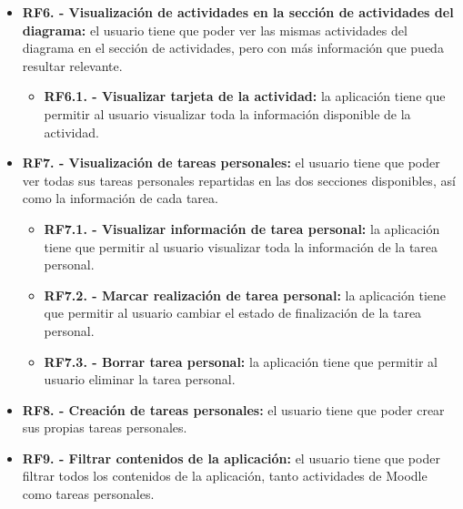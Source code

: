 \begin{itemize}
    \item \textbf{RF6. - Visualización de actividades en la sección de actividades del diagrama:} el usuario tiene que poder ver las mismas actividades del diagrama en el sección de actividades, pero con más información que pueda resultar relevante.
        \begin{itemize}
            \item \textbf{RF6.1. - Visualizar tarjeta de la actividad:} la aplicación tiene que permitir al usuario visualizar toda la información disponible de la actividad.
        \end{itemize}
    \item \textbf{RF7. - Visualización de tareas personales:} el usuario tiene que poder ver todas sus tareas personales repartidas en las dos secciones disponibles, así como la información de cada tarea.
        \begin{itemize}
            \item \textbf{RF7.1. - Visualizar información de tarea personal:} la aplicación tiene que permitir al usuario visualizar toda la información de la tarea personal.
            \item \textbf{RF7.2. - Marcar realización de tarea personal:} la aplicación tiene que permitir al usuario cambiar el estado de finalización de la tarea personal.
            \item \textbf{RF7.3. - Borrar tarea personal:} la aplicación tiene que permitir al usuario eliminar la tarea personal.
        \end{itemize}
    \item \textbf{RF8. - Creación de tareas personales:} el usuario tiene que poder crear sus propias tareas personales.
    \item \textbf{RF9. - Filtrar contenidos de la aplicación:} el usuario tiene que poder filtrar todos los contenidos de la aplicación, tanto actividades de Moodle como tareas personales.
\end{itemize}

